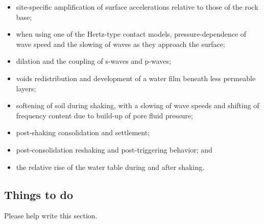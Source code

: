 \documentclass[letterpaper,11pt]{article}
\begin{document}
\begin{enumerate}
\begin{itemize}
\item
site-specific
amplification of surface accelerations relative
to those of the rock base;
\item
when using one of the Hertz-type contact models,
pressure-dependence of wave speed
and the slowing of
waves as they approach the surface;
\item
dilation and the coupling of s-waves and p-waves;
\item
voids redistribution and
development of a water film beneath less permeable layers;
\item
softening of soil during shaking,
with a slowing of wave speeds and shifting of frequency content due
to build-up of pore fluid pressure;
\item
post-shaking consolidation and settlement;
\item
post-consolidation reshaking and post-triggering behavior; and
\item
the relative rise of the water table during and after shaking.
\end{itemize}
\end{enumerate}
%
%
\subsection{Things to do}
Please help write this section.
%
%
%
\end{document}
